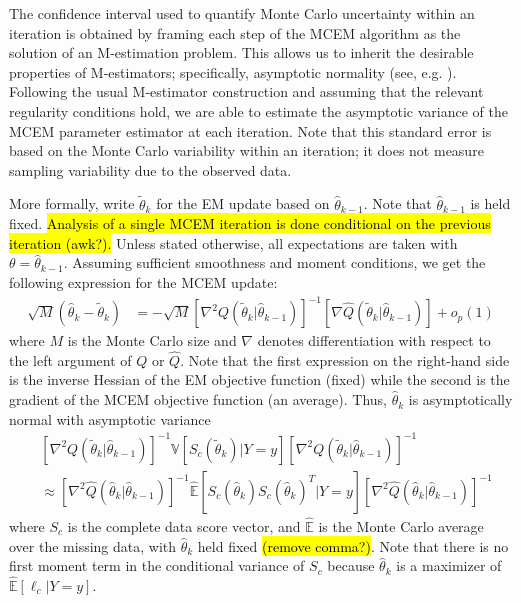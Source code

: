 \documentclass[11pt, oneside]{article}   	%
\newcommand{\bV}{\mathbb{V}}
\newcommand{\bE}{\mathbb{E}}
\newcommand{\hq}{\hat{Q}}
\begin{document}
The confidence interval used to quantify Monte Carlo uncertainty within an iteration is obtained by framing each step of the MCEM algorithm as the solution of an M-estimation problem. This allows us to inherit the desirable properties of M-estimators; specifically, asymptotic normality (see, e.g. \citealp{van98}). Following the usual M-estimator construction and assuming that the relevant regularity conditions hold, we are able to estimate the asymptotic variance of the MCEM parameter estimator at each iteration. Note that this standard error is based on the Monte Carlo variability within an iteration; it does not measure sampling variability due to the observed data. 

More formally, write $\tilde{\theta}_k$ for the EM update based on $\hat{\theta}_{k-1}$. Note that $\hat{\theta}_{k-1}$ is held fixed. \hl{Analysis of a single MCEM iteration is done conditional on the previous iteration (awk?).} Unless stated otherwise, all expectations are taken with $\theta = \hat{\theta}_{k-1}$. Assuming sufficient smoothness and moment conditions, we get the following expression for the MCEM update:
%
\begin{align}
    \sqrt{M}(\hat{\theta}_k - \tilde{\theta}_k) &= - \sqrt{M} \left[ \nabla^2 Q(\tilde{\theta}_k|\hat{\theta}_{k-1})\right]^{-1} \left[\nabla \hq(\tilde{\theta}_k|\hat{\theta}_{k-1}) \right] + o_p(1) \label{eq:th_as_dist}
\end{align}
%
where $M$ is the Monte Carlo size and $\nabla$ denotes differentiation with respect to the left argument of $Q$ or $\hat{Q}$. Note that the first expression on the right-hand side is the inverse Hessian of the EM objective function (fixed) while the second is the gradient of the MCEM objective function (an average). Thus, $\hat{\theta}_k$ is asymptotically normal with asymptotic variance
%
\begin{align}
    &\left[ \nabla^2 Q(\tilde{\theta}_k|\hat{\theta}_{k-1})\right]^{-1} \bV \left[ S_c (\tilde{\theta}_k) | Y=y \right] \left[ \nabla^2 Q(\tilde{\theta}_k|\hat{\theta}_{k-1})\right]^{-1}\\
    &\approx \left[ \nabla^2 \hat{Q}(\hat{\theta}_k|\hat{\theta}_{k-1})\right]^{-1} \hat{\bE} \left[ S_c(\hat{\theta}_k) S_c(\hat{\theta}_k)^T | Y=y \right] \left[ \nabla^2 \hat{Q}(\hat{\theta}_k|\hat{\theta}_{k-1})\right]^{-1} 
\end{align}
%
where $S_c$ is the complete data score vector, and $\hat{\bE}$ is the Monte Carlo average over the missing data, with $\hat{\theta}_k$ held fixed \hl{(remove comma?)}. Note that there is no first moment term in the conditional variance of $S_c$ because $\hat{\theta}_k$ is a maximizer of $\hat{\bE} [\ell_c |Y=y]$.
\end{document}
